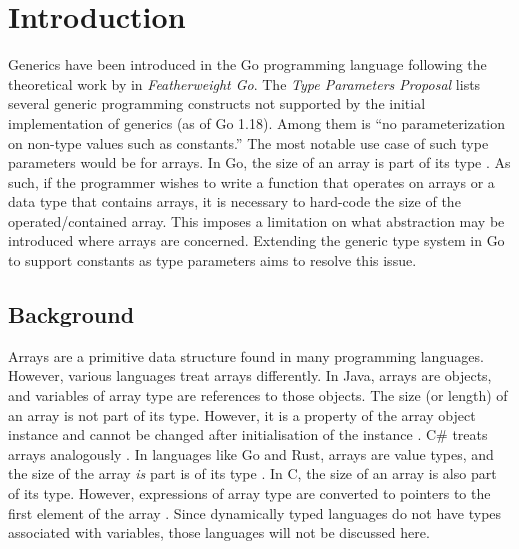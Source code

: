 \section{Introduction}

Generics have been introduced in the Go programming language following the
theoretical work by \textcite{fg} in \emph{Featherweight Go}. The \emph{Type
      Parameters Proposal} lists several generic programming constructs not supported
by the initial implementation of generics (as of Go 1.18). Among them is ``no
parameterization on non-type values such as constants.''
\autocite{genericsProposal} The most notable use case of such type parameters
would be for arrays. In Go, the size of an array is part of its type
\autocite{spec}. As such, if the programmer wishes to write a function that
operates on arrays or a data type that contains arrays, it is necessary to
hard-code the size of the operated/contained array. This imposes a limitation on
what abstraction may be introduced where arrays are concerned. Extending the
generic type system in Go to support constants as type parameters aims to
resolve this issue.

\subsection{Background}

Arrays are a primitive data structure found in many programming languages.
However, various languages treat arrays differently. In Java, arrays are
objects, and variables of array type are references to those objects. The size
(or length) of an array is not part of its type. However, it is a property of the
array object instance and cannot be changed after initialisation of the instance
\autocite{javaSpec}. C\# treats arrays analogously \autocite{cSharpArrays}. In
languages like Go and Rust, arrays are value types, and the size of the array
\emph{is} part is of its type \autocites{spec}{rustSpec}. In C, the size of an
array is also part of its type. However, expressions of array type are converted
to pointers to the first element of the array \autocite{cSpec}. Since
dynamically typed languages do not have types associated with variables, those
languages will not be discussed here.



